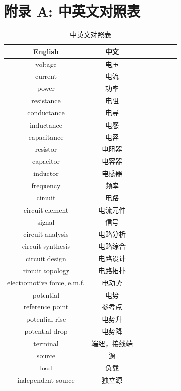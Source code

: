 \documentclass[UTF8]{report}
\theoremstyle{MyLineTheoremStyle} %
\theoremstyle{MyBlockTheoremStyle} %
\theoremstyle{MySubsubsectionStyle} %
\begin{document}
\chapter*{附录 A: 中英文对照表}
\thispagestyle{fancy} 
\setcounter{chapter}{1} 

\begin{multicols}{2}  
\begin{table}[H]\centering
\caption{中英文对照表}
\begin{tabular}{cccccccc}\toprule
    English & 中文 \\
    \midrule
    voltage            & 电压 \\
    current            & 电流 \\
    power              & 功率 \\
    resistance         & 电阻 \\
    conductance        & 电导 \\
    inductance         & 电感 \\
    capacitance        & 电容 \\
    resistor           & 电阻器 \\
    capacitor          & 电容器 \\
    inductor           & 电感器 \\
    frequency          & 频率 \\
    circuit            & 电路 \\
    circuit element    & 电流元件 \\
    signal             & 信号 \\
    circuit analysis   & 电路分析 \\
    circuit synthesis  & 电路综合 \\
    circuit design     & 电路设计 \\
    circuit topology   & 电路拓扑 \\
    electromotive force, e.m.f. & 电动势 \\
    potential & 电势 \\
    reference point & 参考点 \\
    potential rise & 电势升 \\
    potential drop & 电势降 \\
    terminal & 端纽，接线端\\ 
    source & 源 \\
    load & 负载 \\
    independent source & 独立源 \\ 

\end{tabular}
\end{table}
\end{multicols}
\end{document}
